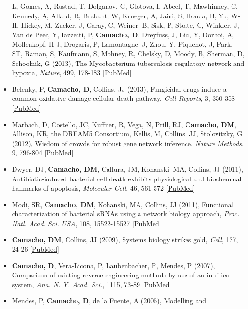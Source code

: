 \documentclass[11pt,a4paper,]{awesome-cv}
\begin{document}
\begin{itemize}
  L, Gomes, A, Rustad, T, Dolganov, G, Glotova, I, Abeel, T, Mawhinney,
  C, Kennedy, A, Allard, R, Brabant, W, Krueger, A, Jaini, S, Honda, B,
  Yu, W-H, Hickey, M, Zucker, J, Garay, C, Weiner, B, Sisk, P, Stolte,
  C, Winkler, J, Van de Peer, Y, Iazzetti, P, \textbf{Camacho, D},
  Dreyfuss, J, Liu, Y, Dorhoi, A, Mollenkopf, H-J, Drogaris, P,
  Lamontagne, J, Zhou, Y, Piquenot, J, Park, ST, Raman, S, Kaufmann, S,
  Mohney, R, Chelsky, D, Moody, B, Sherman, D, Schoolnik, G (2013), The
  Mycobacterium tuberculosis regulatory network and hypoxia,
  \emph{Nature}, 499, 178-183
  {[}\href{https://www.ncbi.nlm.nih.gov/pubmed/23823726}{PubMed}{]}
\item
  Belenky, P, \textbf{Camacho, D}, Collins, JJ (2013), Fungicidal drugs
  induce a common oxidative-damage cellular death pathway, \emph{Cell
  Reports}, 3, 350-358
  {[}\href{https://www.ncbi.nlm.nih.gov/pubmed/23416050}{PubMed}{]}
\item
  Marbach, D, Costello, JC, Kuffner, R, Vega, N, Prill, RJ,
  \textbf{Camacho, DM}, Allison, KR, the DREAM5 Consortium, Kellis, M,
  Collins, JJ, Stolovitzky, G (2012), Wisdom of crowds for robust gene
  network inference, \emph{Nature Methods}, 9, 796-804
  {[}\href{https://www.ncbi.nlm.nih.gov/pubmed/22796662}{PubMed}{]}
\item
  Dwyer, DJ, \textbf{Camacho, DM}, Callura, JM, Kohanski, MA, Collins,
  JJ (2011), Antibiotic-induced bacterial cell death exhibits
  physiological and biochemical hallmarks of apoptosis, \emph{Molecular
  Cell}, 46, 561-572
  {[}\href{https://www.ncbi.nlm.nih.gov/pubmed/22633370}{PubMed}{]}
\item
  Modi, SR, \textbf{Camacho, DM}, Kohanski, MA, Collins, JJ (2011),
  Functional characterization of bacterial sRNAs using a network biology
  approach, \emph{Proc. Natl. Acad. Sci. USA}, 108, 15522-15527
  {[}\href{https://www.ncbi.nlm.nih.gov/pubmed/21876160}{PubMed}{]}
\item
  \textbf{Camacho, DM}, Collins, JJ (2009), Systems biology strikes
  gold, \emph{Cell}, 137, 24-26
  {[}\href{https://www.ncbi.nlm.nih.gov/pubmed/19345182}{PubMed}{]}
\item
  \textbf{Camacho, D}, Vera-Licona, P, Laubenbacher, R, Mendes, P
  (2007), Comparison of existing reverse engineering methods by use of
  an in silico system, \emph{Ann. N. Y. Acad. Sci.}, 1115, 73-89
  {[}\href{https://www.ncbi.nlm.nih.gov/pubmed/17925358}{PubMed}{]}
\item
  Mendes, P, \textbf{Camacho, D}, de la Fuente, A (2005), Modelling and

\end{itemize}
\end{document}

